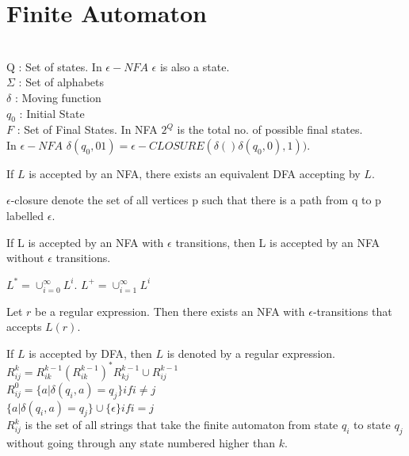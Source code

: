 \documentclass[a4paper,oneside]{book}
\begin{document}
\chapter{Finite Automaton}
\begin{definition}
\\
Q : Set of states. In $\epsilon-NFA$ $\epsilon$ is also a state.\\
$\Sigma$ : Set of alphabets\\
$\delta$ : Moving function\\
$q_0$ : Initial State\\
$F$ : Set of Final States. In NFA $2^Q$ is the total no. of possible final states.\\
In $\epsilon-NFA$ $\delta(q_0, 01) = \epsilon-CLOSURE(\delta()\delta(q_0, 0), 1))$.
\end{definition}
\begin{theorem}
If $L$ is accepted by an NFA, there exists an equivalent DFA accepting by $L$.
\end{theorem}
\begin{definition}
$\epsilon$-closure denote the set of all vertices p such that there is a path from q to p labelled $\epsilon$.
\end{definition}
\begin{definition}
If L is accepted by an NFA with $\epsilon$ transitions, then L is accepted by an NFA without $\epsilon$ transitions.
\end{definition}
\begin{definition}
$L^* = \cup_{i=0}^{\infty} L^i$. $L^+ = \cup_{i=1}^{\infty} L^i$
\end{definition}
\begin{theorem}
Let $r$ be a regular expression. Then there exists an NFA with $\epsilon$-transitions that accepts $L(r)$.
\end{theorem}
\begin{definition}
If $L$ is accepted by DFA, then $L$ is denoted by a regular expression.\\
$R^{k}_{ij} = R^{k-1}_{ik}(R^{k-1}_{ik})^*R_{kj}^{k-1} \cup R_{ij}^{k-1}$\\
$R^{0}_{ij} = \{a| \delta(q_i, a) = q_j \}  if i \neq j$\\
$\{a | \delta(q_i, a) = q_j\} \cup \{\epsilon\}    if i = j$\\
$R^{k}_{ij}$ is the set of all strings that take the finite automaton from state $q_i$ to state $q_j$ without going through any state numbered higher than $k$.
\end{definition}
\end{document}

